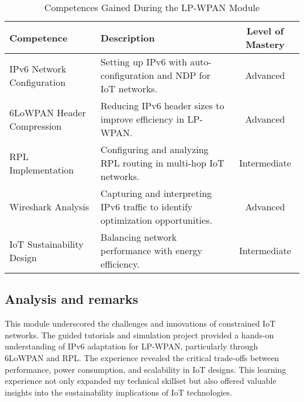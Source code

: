 \begin{table}[h!]
    \centering
    \renewcommand{\arraystretch}{1.5} %
    \begin{tabular}{|p{3.5cm}|p{8cm}|c|}
    \hline
    \rowcolor[gray]{0.8}
    \textbf{Competence} & \textbf{Description} & \textbf{Level of Mastery} \\
    \hline
    IPv6 Network Configuration & Setting up IPv6 with auto-configuration and NDP for IoT networks. & Advanced \\
    \hline
    6LoWPAN Header Compression & Reducing IPv6 header sizes to improve efficiency in LP-WPAN. & Advanced \\
    \hline
    RPL Implementation & Configuring and analyzing RPL routing in multi-hop IoT networks. & Intermediate \\
    \hline
    Wireshark Analysis & Capturing and interpreting IPv6 traffic to identify optimization opportunities. & Advanced \\
    \hline
    IoT Sustainability Design & Balancing network performance with energy efficiency. & Intermediate \\
    \hline
    \end{tabular}
    \caption{Competences Gained During the LP-WPAN Module}
\end{table}

\subsection{Analysis and remarks}
\indent \indent This module underscored the challenges and innovations of constrained IoT networks.
The guided tutorials and simulation project provided a hands-on understanding of IPv6 adaptation for LP-WPAN, particularly through 6LoWPAN and RPL.
The experience revealed the critical trade-offs between performance, power consumption, and scalability in IoT designs.
This learning experience not only expanded my technical skillset but also offered valuable insights into the sustainability implications of IoT technologies.